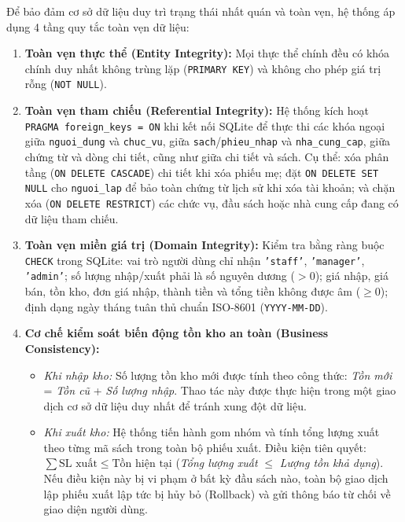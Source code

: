\documentclass[12pt,a4paper]{article}
\begin{document}
Để bảo đảm cơ sở dữ liệu duy trì trạng thái nhất quán và toàn vẹn, hệ thống áp dụng 4 tầng quy tắc toàn vẹn dữ liệu:
\begin{enumerate}
    \item \textbf{Toàn vẹn thực thể (Entity Integrity):} Mọi thực thể chính đều có khóa chính duy nhất không trùng lặp (\texttt{PRIMARY KEY}) và không cho phép giá trị rỗng (\texttt{NOT NULL}).
    \item \textbf{Toàn vẹn tham chiếu (Referential Integrity):} Hệ thống kích hoạt \texttt{PRAGMA foreign\_keys = ON} khi kết nối SQLite để thực thi các khóa ngoại giữa \texttt{nguoi\_dung} và \texttt{chuc\_vu}, giữa \texttt{sach}/\texttt{phieu\_nhap} và \texttt{nha\_cung\_cap}, giữa chứng từ và dòng chi tiết, cũng như giữa chi tiết và sách. Cụ thể: xóa phân tầng (\texttt{ON DELETE CASCADE}) chi tiết khi xóa phiếu mẹ; đặt \texttt{ON DELETE SET NULL} cho \texttt{nguoi\_lap} để bảo toàn chứng từ lịch sử khi xóa tài khoản; và chặn xóa (\texttt{ON DELETE RESTRICT}) các chức vụ, đầu sách hoặc nhà cung cấp đang có dữ liệu tham chiếu.
    \item \textbf{Toàn vẹn miền giá trị (Domain Integrity):} Kiểm tra bằng ràng buộc \texttt{CHECK} trong SQLite: vai trò người dùng chỉ nhận \texttt{'staff'}, \texttt{'manager'}, \texttt{'admin'}; số lượng nhập/xuất phải là số nguyên dương ($> 0$); giá nhập, giá bán, tồn kho, đơn giá nhập, thành tiền và tổng tiền không được âm ($\ge 0$); định dạng ngày tháng tuân thủ chuẩn ISO-8601 (\texttt{YYYY-MM-DD}).
    \item \textbf{Cơ chế kiểm soát biến động tồn kho an toàn (Business Consistency):}
    \begin{itemize}
        \item \textit{Khi nhập kho:} Số lượng tồn kho mới được tính theo công thức: \textit{Tồn mới} = \textit{Tồn cũ} + \textit{Số lượng nhập}. Thao tác này được thực hiện trong một giao dịch cơ sở dữ liệu duy nhất để tránh xung đột dữ liệu.
        \item \textit{Khi xuất kho:} Hệ thống tiến hành gom nhóm và tính tổng lượng xuất theo từng mã sách trong toàn bộ phiếu xuất. Điều kiện tiên quyết: $\sum \text{SL xuất} \le \text{Tồn hiện tại}$ (\textit{Tổng lượng xuất} $\le$ \textit{Lượng tồn khả dụng}). Nếu điều kiện này bị vi phạm ở bất kỳ đầu sách nào, toàn bộ giao dịch lập phiếu xuất lập tức bị hủy bỏ (Rollback) và gửi thông báo từ chối về giao diện người dùng.
    \end{itemize}
\end{enumerate}
\end{document}
